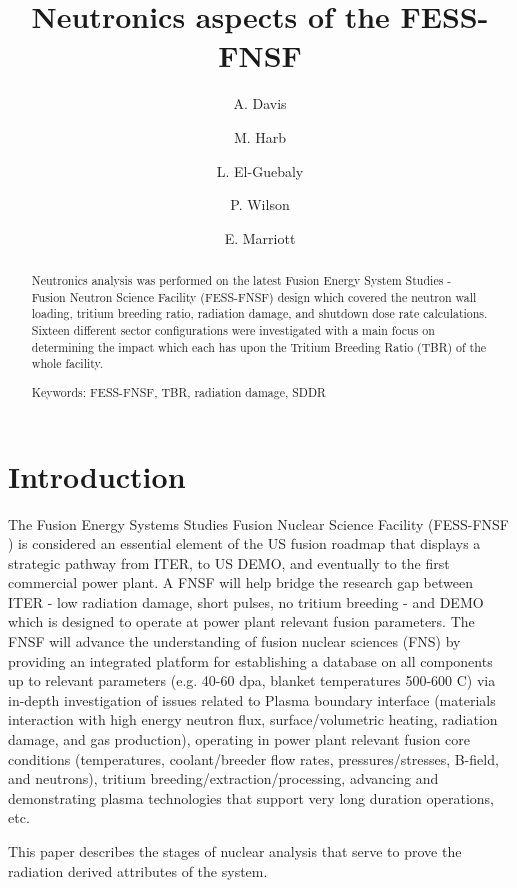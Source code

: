 \documentclass[12pt, letterpaper]{elsarticle}
\title{Neutronics aspects of the FESS-FNSF}
\author[wisc]{A. Davis\corref{cor1}}
\author[wisc]{M. Harb}
\author[wisc]{L. El-Guebaly}
\author[wisc]{P. Wilson}
\author[wisc]{E. Marriott}
\begin{document}
 
\begin{abstract}
Neutronics analysis was performed on the latest Fusion Energy System Studies - Fusion Neutron Science Facility (FESS-FNSF) design which covered the neutron wall loading, tritium breeding ratio, radiation damage, and shutdown dose rate calculations. Sixteen different sector configurations were investigated with a main focus on determining the impact which each has upon the Tritium Breeding Ratio (TBR) of the whole facility.

\vspace{5mm}
\noindent
Keywords: FESS-FNSF, TBR, radiation damage, SDDR
\end{abstract}

\begin{titlepage}
\maketitle
\end{titlepage}

\newpage
\listoffigures

\newpage
\section{Introduction}
The Fusion Energy Systems Studies Fusion Nuclear Science Facility (FESS-FNSF \cite{ref_1}) is considered an essential element of the US fusion roadmap that displays a strategic  pathway from ITER, to US DEMO, and eventually to the first commercial power plant. A FNSF will help bridge the research gap between ITER - low radiation damage, short pulses, no tritium breeding - and DEMO which is designed to operate at power plant relevant fusion parameters. The FNSF will advance the understanding of fusion nuclear sciences (FNS) by providing an integrated platform for establishing a database on all components up to relevant parameters (e.g. 40-60 dpa, blanket temperatures 500-600 C) via in-depth investigation of issues related to Plasma boundary interface (materials interaction with high energy neutron flux, surface/volumetric heating, radiation damage, and gas production), operating in power plant relevant fusion core conditions (temperatures, coolant/breeder flow rates, pressures/stresses, B-field, and neutrons), tritium breeding/extraction/processing, advancing and demonstrating plasma technologies that support very long duration operations, etc.  

This paper describes the stages of nuclear analysis that serve to prove the radiation derived attributes of the system.
\end{document}
